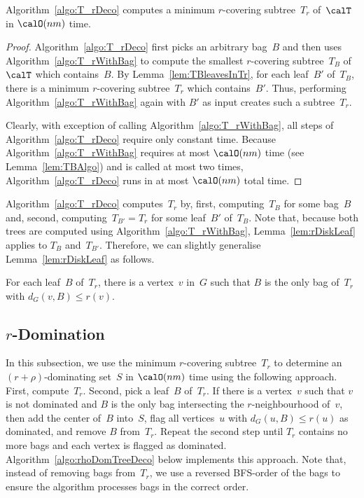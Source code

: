 \begin{lemma}
    \label{lem:computeTr}
Algorithm~\ref{algo:T_rDeco} computes a minimum \( r \)-covering subtree~\( T_r \) of~\( \calT \) in \( \calO(nm) \) time.
\end{lemma}

\begin{proof}
Algorithm~\ref{algo:T_rDeco} first picks an arbitrary bag~$B$ and then uses Algorithm~\ref{algo:T_rWithBag} to compute the smallest $r$-covering subtree~$T_B$ of~$\calT$ which contains~$B$.
By Lemma~\ref{lem:TBleavesInTr}, for each leaf~$B'$ of~$T_B$, there is a minimum $r$-covering subtree~$T_r$ which contains~$B'$.
Thus, performing Algorithm~\ref{algo:T_rWithBag} again with $B'$ as input creates such a subtree~$T_r$.

Clearly, with exception of calling Algorithm~\ref{algo:T_rWithBag}, all steps of Algorithm~\ref{algo:T_rDeco} require only constant time.
Because Algorithm~\ref{algo:T_rWithBag} requires at most $\calO(nm)$ time (see Lemma~\ref{lem:TBAlgo}) and is called at most two times, Algorithm~\ref{algo:T_rDeco} runs in at most $\calO(nm)$ total time.
\end{proof}

Algorithm~\ref{algo:T_rDeco} computes~$T_r$ by, first, computing~$T_B$ for some bag~$B$ and, second, computing~$T_{B'} = T_r$ for some leaf~$B'$ of~$T_B$.
Note that, because both trees are computed using Algorithm~\ref{algo:T_rWithBag}, Lemma~\ref{lem:rDiskLeaf} applies to $T_B$ and~$T_{B'}$.
Therefore, we can slightly generalise Lemma~\ref{lem:rDiskLeaf} as follows.

\begin{corollary}
    \label{cor:rDiskLeaf}
For each leaf~\( B \) of~\( T_r \), there is a vertex~\( v \) in~\( G \) such that \( B \) is the only bag of~\( T_r \) with \( d_G(v, B) \leq r(v) \).
\end{corollary}


\subsection{$r$-Domination}

In this subsection, we use the minimum $r$-covering subtree~$T_r$ to determine an $(r + \rho)$-dominating set~$S$ in $\calO(nm)$ time using the following approach.
First, compute~$T_r$.
Second, pick a leaf~$B$ of~$T_r$.
If there is a vertex~$v$ such that $v$ is not dominated and $B$ is the only bag intersecting the $r$-neighbourhood of~$v$, then add the center of~$B$ into~$S$, flag all vertices~$u$ with $d_G(u, B) \leq r(u)$ as dominated, and remove $B$ from~$T_r$.
Repeat the second step until $T_r$ contains no more bags and each vertex is flagged as dominated.
Algorithm~\ref{algo:rhoDomTreeDeco} below implements this approach.
Note that, instead of removing bags from~$T_r$, we use a reversed BFS-order of the bags to ensure the algorithm processes bags in the correct order.


